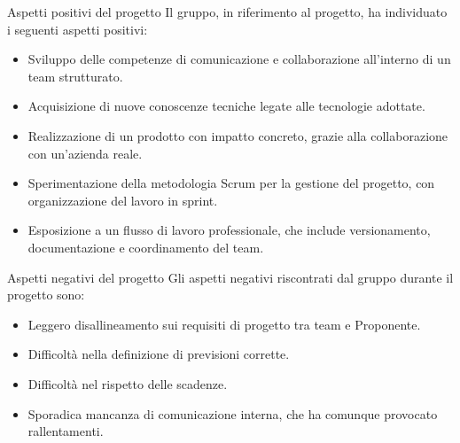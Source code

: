 \documentclass{beamer}
\begin{document}
\begin{frame}{Aspetti positivi del progetto}
  Il gruppo, in riferimento al progetto, ha individuato i seguenti aspetti positivi:
  \begin{itemize}                                
    \item Sviluppo delle competenze di comunicazione e collaborazione 
          all'interno di un team strutturato.
    \item Acquisizione di nuove conoscenze tecniche legate 
          alle tecnologie adottate.
    \item Realizzazione di un prodotto con impatto concreto, 
          grazie alla collaborazione con un'azienda reale.
    \item Sperimentazione della metodologia Scrum per la gestione del progetto, 
          con organizzazione del lavoro in sprint.
    \item Esposizione a un flusso di lavoro professionale, 
          che include versionamento, documentazione e coordinamento del team.
  \end{itemize}
\end{frame}

\begin{frame}{Aspetti negativi del progetto}
  Gli aspetti negativi riscontrati dal gruppo durante il progetto sono:
  \begin{itemize}                                
    \item Leggero disallineamento sui requisiti di progetto tra team e Proponente.
    \item Difficoltà nella definizione di previsioni corrette.
    \item Difficoltà nel rispetto delle scadenze.
    \item Sporadica mancanza di comunicazione interna, che ha comunque provocato rallentamenti.
  \end{itemize}
\end{frame}
\end{document}
